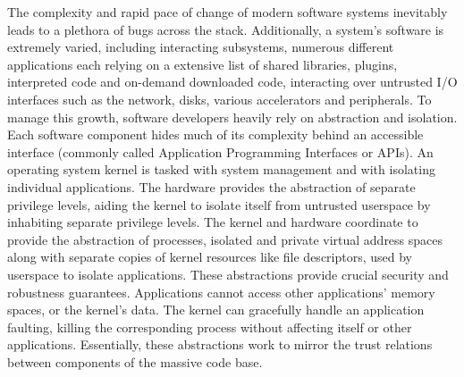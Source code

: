 The complexity and rapid pace of change of modern software systems inevitably
leads to a plethora of bugs across the stack.
Additionally, a system's software is extremely varied, including interacting
subsystems, numerous different applications each relying on a extensive list
of shared libraries, plugins, interpreted code and on-demand downloaded
code, interacting over untrusted I/O interfaces such as the network, disks, 
various accelerators and peripherals.
To manage this growth, software developers heavily rely on
abstraction and isolation.
Each software component hides much of its complexity behind an accessible
interface (commonly called Application Programming Interfaces or APIs).
An operating system kernel is tasked with system management and with 
isolating individual applications.
The hardware provides the abstraction of separate privilege levels, aiding
the kernel to isolate itself from untrusted userspace by inhabiting separate
privilege levels.
The kernel and hardware coordinate to provide the abstraction of processes,
isolated and private virtual address spaces along with separate copies of
kernel resources like file descriptors, used by userspace to isolate
applications.
These abstractions provide crucial security and robustness guarantees.
Applications cannot access other applications' memory spaces, or the
kernel's data.
The kernel can gracefully handle an application faulting, killing the
corresponding process without affecting itself or other applications.
Essentially, these abstractions work to mirror the trust relations between
components of the massive code base.

